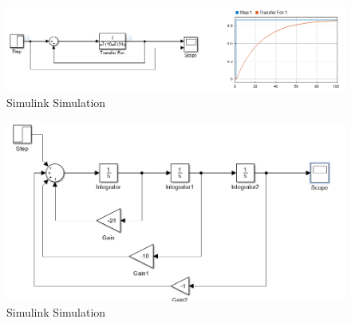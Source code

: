 \documentclass[12pt]{article}
\begin{document}
\begin{figure}[H]
\centering
\includegraphics[scale=0.75]{Simulink.png}
\caption{Simulink Simulation}
\end{figure}

\begin{figure}[H]
\centering
\includegraphics[scale=0.7]{State_Diagram.png}
\caption{Simulink Simulation}
\end{figure}
\end{document}
